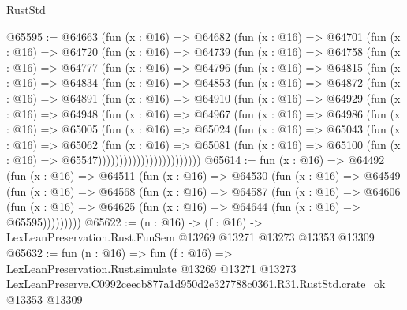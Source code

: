 \begin{lexlean}{RustStd}
\begin{coremodule}
@65595 := @64663
    (fun (x : @16) =>
    @64682
      (fun (x : @16) =>
      @64701
        (fun (x : @16) =>
        @64720
          (fun (x : @16) =>
          @64739
            (fun (x : @16) =>
            @64758
              (fun (x : @16) =>
              @64777
                (fun (x : @16) =>
                @64796
                  (fun (x : @16) =>
                  @64815
                    (fun (x : @16) =>
                    @64834
                      (fun (x : @16) =>
                      @64853
                        (fun (x : @16) =>
                        @64872
                          (fun (x : @16) =>
                          @64891
                            (fun (x : @16) =>
                            @64910
                              (fun (x : @16) =>
                              @64929
                                (fun (x : @16) =>
                                @64948
                                  (fun (x : @16) =>
                                  @64967
                                    (fun (x : @16) =>
                                    @64986
                                      (fun (x : @16) =>
                                      @65005
                                        (fun (x : @16) =>
                                        @65024
                                          (fun (x : @16) =>
                                          @65043
                                            (fun (x : @16) =>
                                            @65062
                                              (fun (x : @16) =>
                                              @65081
                                                (fun (x : @16) =>
                                                @65100
                                                  (fun (x : @16) => @65547))))))))))))))))))))))))
@65614 := fun (x : @16) =>
  @64492
    (fun (x : @16) =>
    @64511
      (fun (x : @16) =>
      @64530
        (fun (x : @16) =>
        @64549
          (fun (x : @16) =>
          @64568
            (fun (x : @16) =>
            @64587
              (fun (x : @16) =>
              @64606
                (fun (x : @16) => @64625 (fun (x : @16) => @64644 (fun (x : @16) => @65595)))))))))
@65622 := (n : @16) ->
  (f : @16) -> LexLeanPreservation.Rust.FunSem @13269 @13271 @13273 @13353 @13309
@65632 := fun (n : @16) =>
  fun (f : @16) =>
  LexLeanPreservation.Rust.simulate
    @13269
    @13271
    @13273
    LexLeanPreserve.C0992ceecb877a1d950d2e327788c0361.R31.RustStd.crate_ok
    @13353
    @13309
\end{coremodule}
\end{lexlean}
